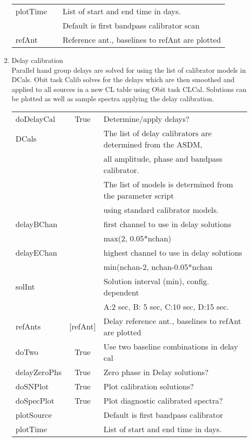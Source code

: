 \documentclass[11pt]{article}
\begin{document}
\begin{enumerate}
\begin{center}
\begin{tabular}{|l|c|l|}
plotTime       & & List of start and end time in days.\\
  &  & Default is first bandpass calibrator scan\\
refAnt  &  & Reference ant., baselines to refAnt are plotted \\
\hline
\end{tabular}
\end{center}
\newpage
%
\item Delay calibration\\
Parallel hand group delays are solved for using the list of
calibrator models in DCals.
Obit task Calib solves for the delays which are then smoothed and
applied to all sources in a new CL table using Obit task CLCal.
Solutions can be plotted as well as sample spectra applying the delay
calibration.
\begin{center}
\begin{tabular}{|l|c|l|}
\hline
doDelayCal  & True &  Determine/apply delays? \\
DCals  &  & The list of delay calibrators are determined from the ASDM, \\
  &  & all amplitude, phase and bandpass calibrator. \\
  &  & The list of models is determined from the parameter script \\
  & & using standard calibrator models. \\
delayBChan  &  &  first channel to use in delay solutions \\
  &  &  max(2, 0.05*nchan)\\
delayEChan  &  &  highest channel to use in delay solutions\\
  &  &  min(nchan-2, nchan-0.05*nchan\\
solInt  &  &  Solution interval (min), config. dependent\\
  &  &  A:2 sec, B: 5 sec, C:10 sec, D:15 sec.\\
refAnts  & [refAnt] & Delay reference ant., baselines to refAnt are plotted \\
doTwo  & True &  Use two baseline combinations in delay cal\\
delayZeroPhs &  True &  Zero phase in Delay solutions?\\
doSNPlot       & True &  Plot calibration solutions?\\
doSpecPlot     & True &  Plot diagnostic calibrated spectra?\\
plotSource     & & Default is first bandpass calibrator\\
plotTime       & & List of start and end time in days.\\

\end{tabular}
\end{center}
\end{enumerate}
\end{document}
